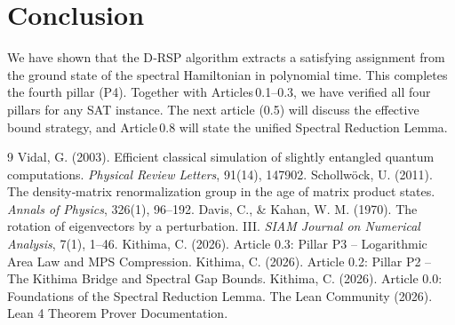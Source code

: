 \documentclass[11pt,a4paper]{article}
\begin{document}
\section{Conclusion}

We have shown that the D‑RSP algorithm extracts a satisfying assignment from the ground state of the spectral Hamiltonian in polynomial time. This completes the fourth pillar (P4). Together with Articles 0.1–0.3, we have verified all four pillars for any SAT instance. The next article (0.5) will discuss the effective bound strategy, and Article 0.8 will state the unified Spectral Reduction Lemma.


\begin{thebibliography}{9}
  Vidal, G. (2003). Efficient classical simulation of slightly entangled quantum computations. \emph{Physical Review Letters}, 91(14), 147902.
  Schollwöck, U. (2011). The density‑matrix renormalization group in the age of matrix product states. \emph{Annals of Physics}, 326(1), 96–192.
  Davis, C., \& Kahan, W. M. (1970). The rotation of eigenvectors by a perturbation. III. \emph{SIAM Journal on Numerical Analysis}, 7(1), 1–46.
  Kithima, C. (2026). Article 0.3: Pillar P3 – Logarithmic Area Law and MPS Compression.
  Kithima, C. (2026). Article 0.2: Pillar P2 – The Kithima Bridge and Spectral Gap Bounds.
  Kithima, C. (2026). Article 0.0: Foundations of the Spectral Reduction Lemma.
  The Lean Community (2026). Lean 4 Theorem Prover Documentation.
\end{thebibliography}
\end{document}

